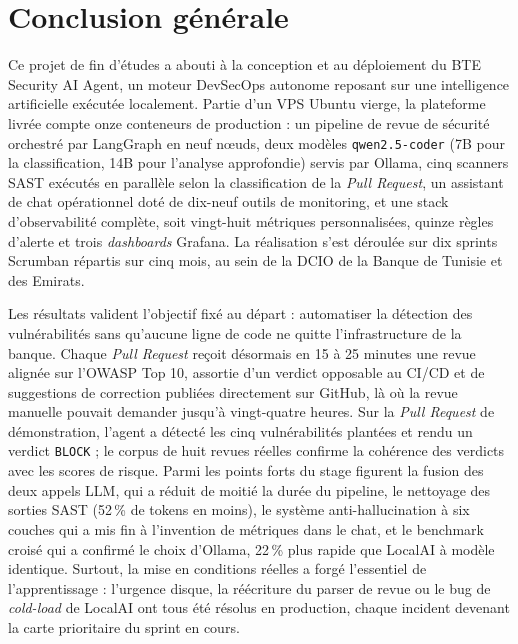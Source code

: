 \chapter*{Conclusion générale}

Ce projet de fin d'études a abouti à la conception et au déploiement
du BTE Security AI Agent, un moteur DevSecOps autonome reposant sur une intelligence
artificielle exécutée localement. Partie d'un VPS Ubuntu vierge, la plateforme livrée
compte onze conteneurs de production : un pipeline de revue de sécurité orchestré par
LangGraph en neuf nœuds, deux modèles \texttt{qwen2.\allowbreak{}5-coder} (7B pour la
classification, 14B pour l'analyse approfondie) servis par Ollama, cinq scanners SAST
exécutés en parallèle selon la classification de la \textit{Pull Request}, un assistant
de chat opérationnel doté de dix-neuf outils de monitoring, et une stack d'observabilité
complète, soit vingt-huit métriques personnalisées, quinze règles d'alerte et trois
\textit{dashboards} Grafana. La réalisation s'est déroulée sur dix sprints Scrumban
répartis sur cinq mois, au sein de la DCIO de la Banque de Tunisie et des Emirats.

Les résultats valident l'objectif fixé au départ : automatiser la détection des
vulnérabilités sans qu'aucune ligne de code ne quitte l'infrastructure de la banque.
Chaque \textit{Pull Request} reçoit désormais en 15 à 25 minutes une revue alignée sur
l'OWASP Top 10, assortie d'un verdict opposable au CI/CD et de suggestions de correction
publiées directement sur GitHub, là où la revue manuelle pouvait demander jusqu'à
vingt-quatre heures. Sur la \textit{Pull Request} de démonstration, l'agent a détecté
les cinq vulnérabilités plantées et rendu un verdict \texttt{BLOCK} ; le corpus de huit
revues réelles confirme la cohérence des verdicts avec les scores de risque. Parmi les
points forts du stage figurent la fusion des deux appels LLM, qui a réduit de moitié la
durée du pipeline, le nettoyage des sorties SAST (52\,\% de tokens en moins), le système
anti-hallucination à six couches qui a mis fin à l'invention de métriques dans le chat,
et le benchmark croisé qui a confirmé le choix d'Ollama, 22\,\% plus rapide que LocalAI
à modèle identique. Surtout, la mise en conditions réelles a forgé l'essentiel de
l'apprentissage : l'urgence disque, la réécriture du parser de revue ou le bug de
\textit{cold-load} de LocalAI ont tous été résolus en production, chaque incident
devenant la carte prioritaire du sprint en cours.

